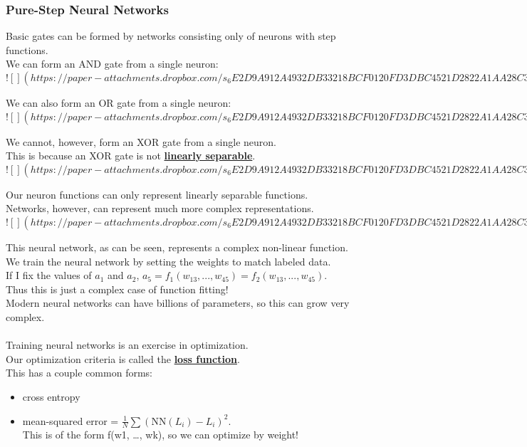 \documentclass[../../lecture_notes.tex]{subfiles}
\begin{document}
\subsubsection*{Pure-Step Neural Networks}
\noindent Basic gates can be formed by networks consisting only of neurons with step functions.\\

We can form an AND gate from a single neuron:
\newpage
$![](https://paper-attachments.dropbox.com/s_6E2D9A912A4932DB33218BCF0120FD3DBC4521D2822A1AA28C3A628B5392148D_1591132995454_Untitled+drawing+4.jpg)$

\noindent We can also form an OR gate from a single neuron:
\newpage
$![](https://paper-attachments.dropbox.com/s_6E2D9A912A4932DB33218BCF0120FD3DBC4521D2822A1AA28C3A628B5392148D_1591133040302_Untitled+drawing+5.jpg)$
\newpage

We cannot, however, form an XOR gate from a single neuron.\\
This is because an XOR gate is not \textbf{\underline{linearly separable}}.
\newpage
$![](https://paper-attachments.dropbox.com/s_6E2D9A912A4932DB33218BCF0120FD3DBC4521D2822A1AA28C3A628B5392148D_1591133370907_Untitled+drawing+6.jpg)$
\newpage

\noindent Our neuron functions can only represent linearly separable functions.\\
Networks, however, can represent much more complex representations.\\

\newpage
$![](https://paper-attachments.dropbox.com/s_6E2D9A912A4932DB33218BCF0120FD3DBC4521D2822A1AA28C3A628B5392148D_1591133796275_Untitled+drawing+7.jpg)$
\newpage

\noindent This neural network, as can be seen, represents a complex non-linear function.\\
We train the neural network by setting the weights to match labeled data.\\
If I fix the values of $a_1$ and $a_2$, $a_5 = f_1(w_{13}, ..., w_{45}) = f_2(w_{13}, ..., w_{45})$.\\
Thus this is just a complex case of function fitting!\\
Modern neural networks can have billions of parameters, so this can grow very complex.\\
\\
Training neural networks is an exercise in optimization.\\
Our optimization criteria is called the \textbf{\underline{loss function}}.\\
This has a couple common forms:
\begin{itemize} [itemsep=0mm]
	\item cross entropy
	\item mean-squared error = $\frac {1}{N} \sum (\text{NN}(L_i) - L_i)^2$.\\
		This is of the form f(w1, …, wk), so we can optimize by weight!
\end{itemize} \medskip
\end{document}
